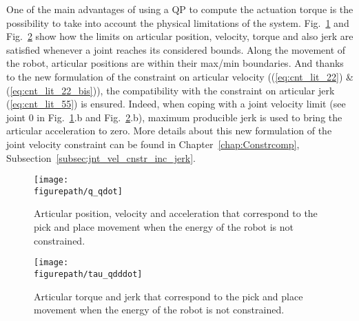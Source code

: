 One of the main advantages of using a QP to compute the actuation torque is the possibility to take into account the physical limitations of the system.  Fig.~\ref{fig:q_qdot} and Fig.~\ref{fig:tau_qdddot} show how the limits on articular position, velocity, torque and also jerk are satisfied whenever a joint reaches its considered bounds. Along the movement of the robot, articular positions are within their max/min boundaries. And thanks to the new formulation of the constraint on articular velocity ((\ref{eq:cnt_lit_22}) \& (\ref{eq:cnt_lit_22_bis})), the compatibility with the constraint on articular jerk (\ref{eq:cnt_lit_55}) is ensured. Indeed, when coping with a joint velocity limit (see joint $0$ in Fig.~\ref{fig:q_qdot}.b and Fig.~\ref{fig:tau_qdddot}.b), maximum producible jerk is used to bring the articular acceleration to zero. More details about this new formulation of the joint velocity constraint can be found in Chapter~\ref{chap:Constrcomp}, Subsection~\ref{subsec:jnt_vel_cnstr_inc_jerk}.
\begin{figure}[!htbp]
\centering
{\texttt{[image: \\figurepath/q\_qdot]}}
\caption{Articular position, velocity and acceleration that correspond to the pick and place movement when the energy of the robot is not constrained.} 
\label{fig:q_qdot}
\end{figure}
\begin{figure}[!htbp]
\centering
{\texttt{[image: \\figurepath/tau\_qdddot]}}
\caption{Articular torque and jerk that correspond to the pick and place movement when the energy of the robot is not constrained.} 
\label{fig:tau_qdddot}
\end{figure}
